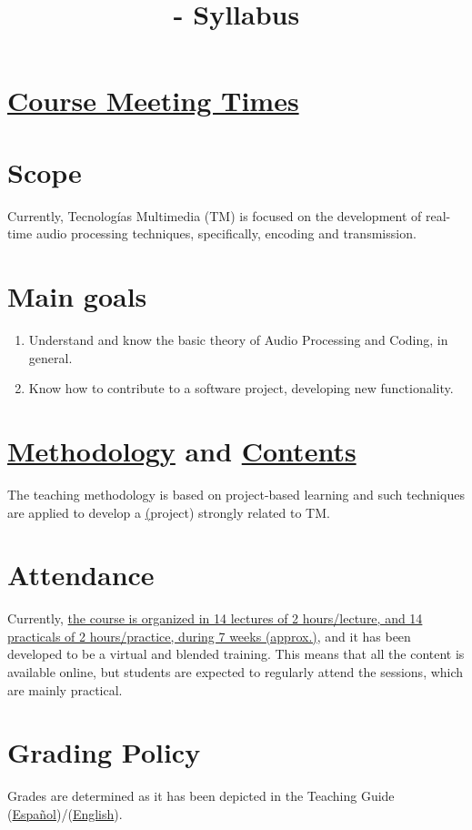 

\title{\TM{} - Syllabus}

\maketitle

\section{\href{https://www.ual.es/estudios/grados/presentacion/plandeestudios/asignatura/4015/40154321}{Course Meeting Times}}

\section{Scope}
Currently, Tecnologías Multimedia (TM) is focused on the development
of real-time audio processing techniques, specifically, encoding and
transmission.

\section{Main goals}
\begin{enumerate}
\item Understand and know the basic theory of Audio Processing and Coding, in general.
\item Know how to contribute to a software project, developing new functionality.
\end{enumerate}

\section{\href{http://portafirma.ual.es/pfirma/downloadReport/file?idDocument=4u61Ie5es2&idRequest=ZeBY35LlFa}{Methodology} and \href{https://tecnologias-multimedia.github.io/contents/}{Contents}}
The teaching methodology is based on project-based learning and such
techniques are applied to develop a
\href{https://github.com/Tecnologias-Multimedia/intercom}(project)
strongly related to TM.

\section{Attendance}
Currently,
\href{https://www.ual.es/estudios/grados/presentacion/plandeestudios/asignatura/4015/40154321}{the
  course is organized in 14 lectures of 2 hours/lecture, and 14
  practicals of 2 hours/practice, during 7 weeks (approx.)}, and it
has been developed to be a virtual and blended training. This means
that all the content is available online, but students are expected to
regularly attend the sessions, which are mainly practical.

\section{Grading Policy}
Grades are determined as it has been depicted in the Teaching Guide
(\href{https://portafirma.ual.es/pfirma/downloadReport/file?idDocument=4Jp82utmug&idRequest=QY36GYcOZQ}{Español})/(\href{https://portafirma.ual.es/pfirma/downloadReport/file?idDocument=Zcmom6qigD&idRequest=xXgueuk9oD}{English}).
